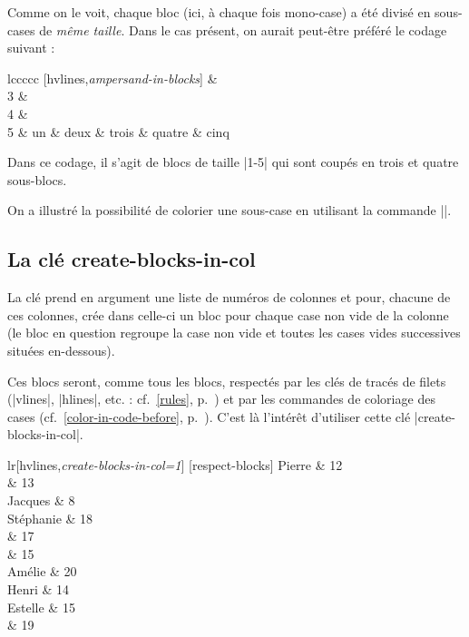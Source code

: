 \documentclass[dvipsnames]{article}
\begin{document}
\medskip
Comme on le voit, chaque bloc (ici, à chaque fois mono-case) a été divisé en
sous-cases de \emph{même taille}. Dans le cas présent, on aurait peut-être
préféré le codage suivant :

\medskip
\begin{Code}[width=85mm,show-output,no-cell-nodes]
\begin{NiceTabular}{lccccc}%
   [hvlines,\emph{ampersand-in-blocks}]
  &  \\ 
3 &  \\
4 &  \\
5 & un & deux & trois & quatre & cinq \\
\end{NiceTabular}
\end{Code}

\medskip
Dans ce codage, il s'agit de blocs de taille |1-5| qui sont coupés en trois et
quatre sous-blocs.

\medskip
On a illustré la possibilité de colorier une sous-case en utilisant la commande
|\cellcolor|.


\subsection{La clé create-blocks-in-col}
\label{create-blocks-in-col}

La clé  prend en argument une liste de numéros de colonnes
et pour, chacune de ces colonnes, crée dans celle-ci un bloc pour chaque case non vide
de la colonne (le bloc en question regroupe la case non vide et toutes les cases vides
successives situées en-dessous).

Ces blocs seront, comme tous les blocs, respectés par les clés de tracés de
filets (|vlines|, |hlines|, etc. : cf.~\ref{rules}, p.~\pageref{rules})
et par les commandes de coloriage des cases (cf.~\ref{color-in-code-before},
p.~\pageref{color-in-code-before}). C'est là l'intérêt d'utiliser cette clé
|create-blocks-in-col|.

\bigskip
\begin{Code}[width=11cm,show-output]
\begin{NiceTabular}{lr}[hvlines,\emph{create-blocks-in-col=1}]
[respect-blocks]
Pierre    & 12 \\
          & 13 \\
Jacques   &  8 \\
Stéphanie & 18 \\
          & 17 \\
          & 15 \\
Amélie    & 20 \\
Henri     & 14 \\
Estelle   & 15 \\
          & 19
\end{NiceTabular}
\end{Code}
\end{document}
